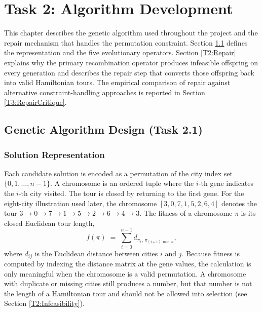 \section{Task 2: Algorithm Development}
\label{Task2}

This chapter describes the genetic algorithm used throughout the project and
the repair mechanism that handles the permutation constraint. Section
\ref{T2:GADesign} defines the representation and the five evolutionary
operators. Section \ref{T2:Repair} explains why the primary recombination
operator produces infeasible offspring on every generation and describes the
repair step that converts those offspring back into valid Hamiltonian tours.
The empirical comparison of repair against alternative constraint-handling
approaches is reported in Section \ref{T3:RepairCritique}.

\subsection{Genetic Algorithm Design (Task 2.1)}
\label{T2:GADesign}

\subsubsection{Solution Representation}
\label{T2:Representation}
Each candidate solution is encoded as a permutation of the city index set
$\{0, 1, \ldots, n-1\}$. A chromosome is an ordered tuple where the
$i$-th gene indicates the $i$-th city visited. The tour is closed by returning
to the first gene. For the eight-city illustration used later, the
chromosome $[3,0,7,1,5,2,6,4]$ denotes the tour
$3 \to 0 \to 7 \to 1 \to 5 \to 2 \to 6 \to 4 \to 3$. The fitness of a
chromosome $\pi$ is its closed Euclidean tour length,
\begin{equation}
f(\pi) \;=\; \sum_{i=0}^{n-1} d_{\pi_i,\,\pi_{(i+1) \bmod n}},
\end{equation}
where $d_{ij}$ is the Euclidean distance between cities $i$ and $j$.
Because fitness is computed by indexing the distance matrix at the gene
values, the calculation is only meaningful when the chromosome is a valid
permutation. A chromosome with duplicate or missing cities still produces a
number, but that number is not the length of a Hamiltonian tour and should
not be allowed into selection (see Section \ref{T2:Infeasibility}).

